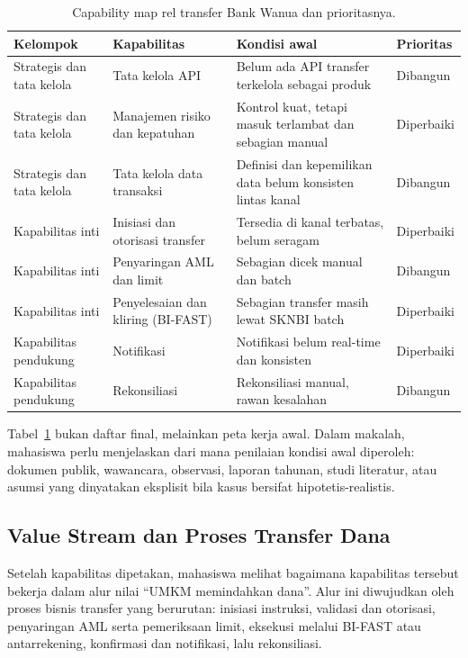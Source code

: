 \begin{table}[htbp]
\centering
\scriptsize
\caption{Capability map rel transfer Bank Wanua dan prioritasnya.}
\label{tab:capability-bank-wanua}
\begin{tabularx}{\textwidth}{@{}p{} p{} X X@{}}
\hline
\textbf{Kelompok} & \textbf{Kapabilitas} & \textbf{Kondisi awal} & \textbf{Prioritas} \\
\hline
Strategis dan tata kelola & Tata kelola API & Belum ada API transfer terkelola
sebagai produk & Dibangun \\
Strategis dan tata kelola & Manajemen risiko dan kepatuhan & Kontrol kuat,
tetapi masuk terlambat dan sebagian manual & Diperbaiki \\
Strategis dan tata kelola & Tata kelola data transaksi & Definisi dan
kepemilikan data belum konsisten lintas kanal & Dibangun \\
Kapabilitas inti & Inisiasi dan otorisasi transfer & Tersedia di kanal terbatas,
belum seragam & Diperbaiki \\
Kapabilitas inti & Penyaringan AML dan limit & Sebagian dicek manual dan batch &
Dibangun \\
Kapabilitas inti & Penyelesaian dan kliring (BI-FAST) & Sebagian transfer masih
lewat SKNBI batch & Diperbaiki \\
Kapabilitas pendukung & Notifikasi & Notifikasi belum real-time dan konsisten &
Diperbaiki \\
Kapabilitas pendukung & Rekonsiliasi & Rekonsiliasi manual, rawan kesalahan &
Dibangun \\
\hline
\end{tabularx}
\end{table}

Tabel~\ref{tab:capability-bank-wanua} bukan daftar final, melainkan peta kerja
awal. Dalam makalah, mahasiswa perlu menjelaskan dari mana penilaian kondisi awal
diperoleh: dokumen publik, wawancara, observasi, laporan tahunan, studi
literatur, atau asumsi yang dinyatakan eksplisit bila kasus bersifat
hipotetis-realistis.

\subsection{Value Stream dan Proses Transfer Dana}

Setelah kapabilitas dipetakan, mahasiswa melihat bagaimana kapabilitas tersebut
bekerja dalam alur nilai ``UMKM memindahkan dana''. Alur ini diwujudkan oleh
proses bisnis transfer yang berurutan: inisiasi instruksi, validasi dan
otorisasi, penyaringan AML serta pemeriksaan limit, eksekusi melalui BI-FAST
atau antarrekening, konfirmasi dan notifikasi, lalu rekonsiliasi.

